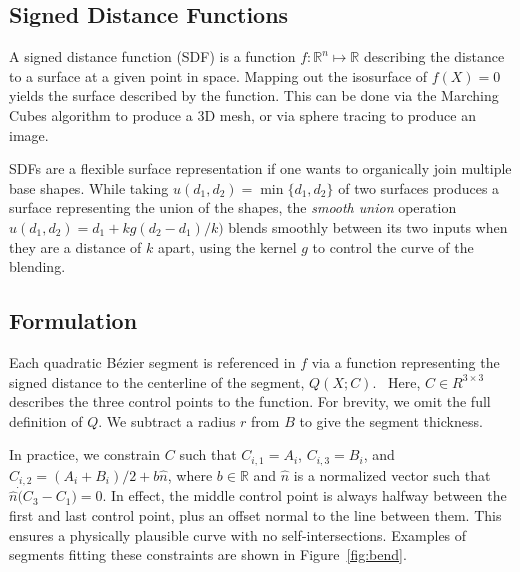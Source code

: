 \documentclass[%
reprint,
twocolumn,
nofootinbib,
 amsmath,amssymb,
 aps,
]{revtex4-2}
\begin{document}
\subsection{Signed Distance Functions}

A signed distance function (SDF) is a function $f: \mathbb{R}^n \mapsto \mathbb{R}$ describing the distance to a surface at a given point in space. Mapping out the isosurface of $f(X) = 0$ yields the surface described by the function. This can be done via the Marching Cubes algorithm to produce a 3D mesh, or via sphere tracing to produce an image.

SDFs are a flexible surface representation if one wants to organically join multiple base shapes. While taking $u(d_1,d_2)=\min\{d_1, d_2\}$ of two surfaces produces a surface representing the union of the shapes, the \emph{smooth union} operation $u(d_1,d_2)=d_1 + kg(d_2-d_1)/k)$ blends smoothly between its two inputs when they are a distance of $k$ apart, using the kernel $g$ to control the curve of the blending.

\subsection{Formulation}

Each quadratic B\'ezier segment is referenced in $f$ via a function representing the signed distance to the centerline of the segment, $Q(X; C)$.~\cite{iq2d} Here, $C \in R^{3 \times 3}$ describes the three control points to the function. For brevity, we omit the full definition of $Q$. We subtract a radius $r$ from $B$ to give the segment thickness.

In practice, we constrain $C$ such that $C_{i,1}=A_i$, $C_{i,3}=B_i$, and $C_{i,2} = (A_i + B_i)/2 + b\hat{n}$, where $b \in \mathbb{R}$ and $\hat{n}$ is a normalized vector such that $\hat{n} \dot (C_3 - C_1) = 0$. In effect, the middle control point is always halfway between the first and last control point, plus an offset normal to the line between them. This ensures a physically plausible curve with no self-intersections. Examples of segments fitting these constraints are shown in Figure~\ref{fig:bend}.
\end{document}
